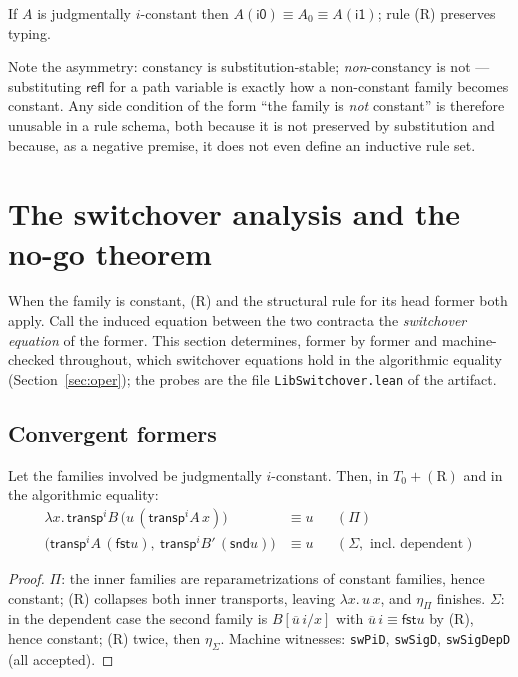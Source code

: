 \documentclass{lmcs}
\newcommand{\transp}{\mathsf{transp}}
\newcommand{\refl}{\mathsf{refl}}
\renewcommand{\conv}{\equiv}
\providecommand{\fst}{}\renewcommand{\fst}{\mathsf{fst}}
\providecommand{\snd}{}\renewcommand{\snd}{\mathsf{snd}}
\newcommand{\ii}{\mathsf{i1}}
\newcommand{\io}{\mathsf{i0}}
\begin{document}
\begin{lem}\label{lem:preservation}
  If $A$ is judgmentally $i$-constant then
  $A(\io) \conv A_0 \conv A(\ii)$; rule (R) preserves typing.
\end{lem}

\noindent Note the asymmetry: constancy is substitution-stable;
\emph{non}-constancy is not --- substituting $\refl$ for a path
variable is exactly how a non-constant family becomes constant.  Any
side condition of the form ``the family is \emph{not} constant'' is
therefore unusable in a rule schema, both because it is not preserved
by substitution and because, as a negative premise, it does not even
define an inductive rule set.

\section{The switchover analysis and the no-go theorem}
\label{sec:switchover}

When the family is constant, (R) and the structural rule for its head
former both apply.  Call the induced equation between the two
contracta the \emph{switchover equation} of the former.  This section
determines, former by former and machine-checked throughout, which
switchover equations hold in the algorithmic equality
(Section~\ref{sec:oper}); the probes are the file
\texttt{LibSwitchover.lean} of the artifact.

\subsection{Convergent formers}
\label{sec:convergent}

\begin{lem}
  \label{lem:converge}
  Let the families involved be judgmentally $i$-constant.  Then, in
  $T_0 + (\mathrm{R})$ and in the algorithmic equality:
  \begin{align*}
    \lambda x.\,\transp^i B\,\bigl(u\,(\transp^i A\,x)\bigr)
      &\conv u  &&(\Pi)\\
    \bigl(\transp^i A\,(\fst u),\ \transp^i B'\,(\snd u)\bigr)
      &\conv u  &&(\Sigma, \text{ incl.\ dependent})
  \end{align*}
\end{lem}
\begin{proof}
  $\Pi$: the inner families are reparametrizations of constant
  families, hence constant; (R) collapses both inner transports,
  leaving $\lambda x.\,u\,x$, and $\eta_\Pi$ finishes.  $\Sigma$: in
  the dependent case the second family is $B[\overline{u}\,i/x]$ with
  $\overline{u}\,i \conv \fst u$ by (R), hence constant; (R) twice,
  then $\eta_\Sigma$.  Machine witnesses: \texttt{swPiD},
  \texttt{swSigD}, \texttt{swSigDepD} (all accepted).
\end{proof}
\end{document}
